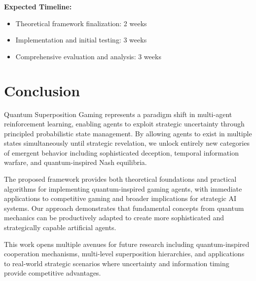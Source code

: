 \documentclass[11pt,a4paper]{article}
\begin{document}
\textbf{Expected Timeline:}
\begin{itemize}
\item Theoretical framework finalization: 2 weeks
\item Implementation and initial testing: 3 weeks
\item Comprehensive evaluation and analysis: 3 weeks
\end{itemize}

\section{Conclusion}

Quantum Superposition Gaming represents a paradigm shift in multi-agent reinforcement learning, enabling agents to exploit strategic uncertainty through principled probabilistic state management. By allowing agents to exist in multiple states simultaneously until strategic revelation, we unlock entirely new categories of emergent behavior including sophisticated deception, temporal information warfare, and quantum-inspired Nash equilibria.

The proposed framework provides both theoretical foundations and practical algorithms for implementing quantum-inspired gaming agents, with immediate applications to competitive gaming and broader implications for strategic AI systems. Our approach demonstrates that fundamental concepts from quantum mechanics can be productively adapted to create more sophisticated and strategically capable artificial agents.

This work opens multiple avenues for future research including quantum-inspired cooperation mechanisms, multi-level superposition hierarchies, and applications to real-world strategic scenarios where uncertainty and information timing provide competitive advantages.
\end{document}

